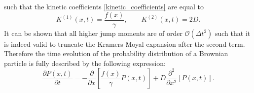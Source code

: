 such that the kinetic coefficients \eqref{kinetic_coefficients} are equal to
\begin{equation}
    \boxed{K^{(1)}(x,t) = \frac{f(x)}{\gamma}, \qquad K^{(2)}(x,t) = 2 D.}
    \label{BD_kinetic_coefficients}
\end{equation}
It can be shown that all higher jump moments are of order $\mathcal{O}(\Delta t ^{2})$ such that it is indeed valid to truncate the Kramers Moyal expansion after the second term. Therefore the time evolution of the probability distribution of a Brownian particle is fully described by the following expression:
\begin{equation}
    \frac{\partial P(x,t)}{\partial t} = - \frac{\partial}{\partial x} \left[\frac{f(x)}{\gamma}P(x,t) \right] + D\frac{\partial^2}{\partial x^2}\left[P(x,t) \right] .
    \label{FPE2}
\end{equation}

